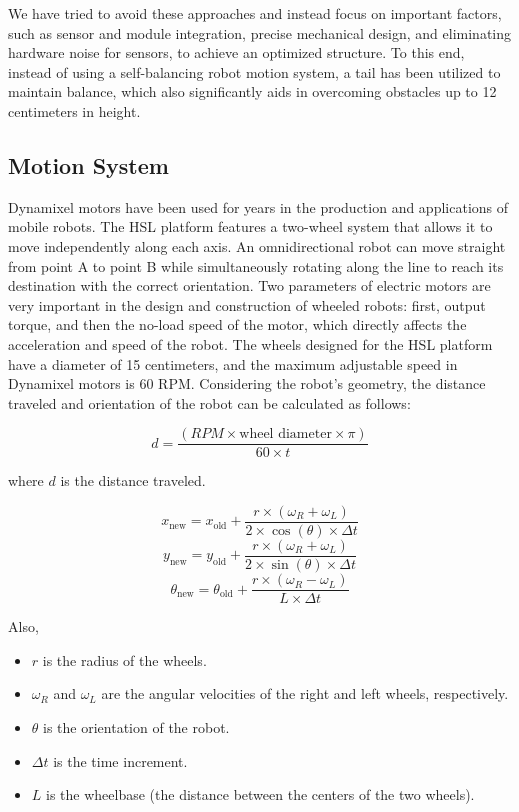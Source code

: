 \documentclass[conference]{IEEEtran}
\begin{document}
We have tried to avoid these approaches and instead focus on important factors, such as sensor and module integration, precise mechanical design, and eliminating hardware noise for sensors, to achieve an optimized structure. To this end, instead of using a self-balancing robot motion system, a tail has been utilized to maintain balance, which also significantly aids in overcoming obstacles up to 12 centimeters in height.

\subsection{Motion System}
Dynamixel motors have been used for years in the production and applications of mobile robots. The HSL platform features a two-wheel system that allows it to move independently along each axis. An omnidirectional robot can move straight from point A to point B while simultaneously rotating along the line to reach its destination with the correct orientation. Two parameters of electric motors are very important in the design and construction of wheeled robots: first, output torque, and then the no-load speed of the motor, which directly affects the acceleration and speed of the robot. The wheels designed for the HSL platform have a diameter of 15 centimeters, and the maximum adjustable speed in Dynamixel motors is 60 RPM. Considering the robot's geometry, the distance traveled and orientation of the robot can be calculated as follows:

\begin{equation}
d = \frac{(RPM \times \text{wheel diameter} \times \pi)}{60 \times t} \label{eq:distance}
\end{equation}

where \( d \) is the distance traveled.

\begin{equation}
x_{\text{new}} = x_{\text{old}} + \frac{r \times (\omega_R + \omega_L)}{2 \times \cos(\theta) \times \Delta t}
\end{equation}
\begin{equation}
y_{\text{new}} = y_{\text{old}} + \frac{r \times (\omega_R + \omega_L)}{2 \times \sin(\theta) \times \Delta t}
\end{equation}
\begin{equation}
\theta_{\text{new}} = \theta_{\text{old}} + \frac{r \times (\omega_R - \omega_L)}{L \times \Delta t}
\end{equation}

Also,
\begin{itemize}
    \item \( r \) is the radius of the wheels.
    \item \( \omega_R \) and \( \omega_L \) are the angular velocities of the right and left wheels, respectively.
    \item \( \theta \) is the orientation of the robot.
    \item \( \Delta t \) is the time increment.
    \item \( L \) is the wheelbase (the distance between the centers of the two wheels).
\end{itemize}
\end{document}
